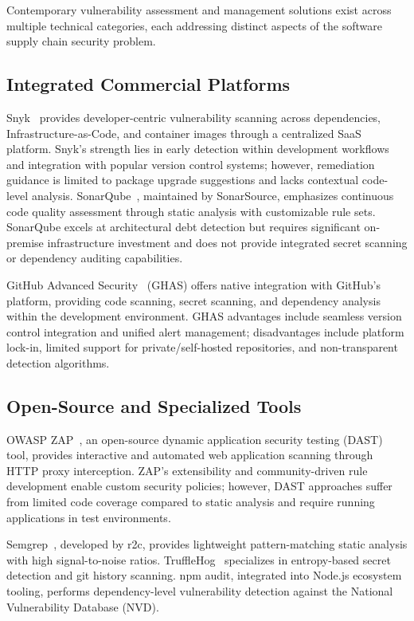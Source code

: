 \documentclass[10pt, conference, compsocconf]{IEEEtran}
\begin{document}
Contemporary vulnerability assessment and management solutions exist across multiple technical categories, each addressing distinct aspects of the software supply chain security problem.

\subsection{Integrated Commercial Platforms}

Snyk~\cite{snyk2023} provides developer-centric vulnerability scanning across dependencies, Infrastructure-as-Code, and container images through a centralized SaaS platform. Snyk's strength lies in early detection within development workflows and integration with popular version control systems; however, remediation guidance is limited to package upgrade suggestions and lacks contextual code-level analysis. SonarQube~\cite{sonarqube2023}, maintained by SonarSource, emphasizes continuous code quality assessment through static analysis with customizable rule sets. SonarQube excels at architectural debt detection but requires significant on-premise infrastructure investment and does not provide integrated secret scanning or dependency auditing capabilities.

GitHub Advanced Security~\cite{githubsecurity2023} (GHAS) offers native integration with GitHub's platform, providing code scanning, secret scanning, and dependency analysis within the development environment. GHAS advantages include seamless version control integration and unified alert management; disadvantages include platform lock-in, limited support for private/self-hosted repositories, and non-transparent detection algorithms.

\subsection{Open-Source and Specialized Tools}

OWASP ZAP~\cite{owaspzap2023}, an open-source dynamic application security testing (DAST) tool, provides interactive and automated web application scanning through HTTP proxy interception. ZAP's extensibility and community-driven rule development enable custom security policies; however, DAST approaches suffer from limited code coverage compared to static analysis and require running applications in test environments.

Semgrep~\cite{semgrep2023}, developed by r2c, provides lightweight pattern-matching static analysis with high signal-to-noise ratios. TruffleHog~\cite{trufflehog2023} specializes in entropy-based secret detection and git history scanning. npm audit, integrated into Node.js ecosystem tooling, performs dependency-level vulnerability detection against the National Vulnerability Database (NVD).
\end{document}
